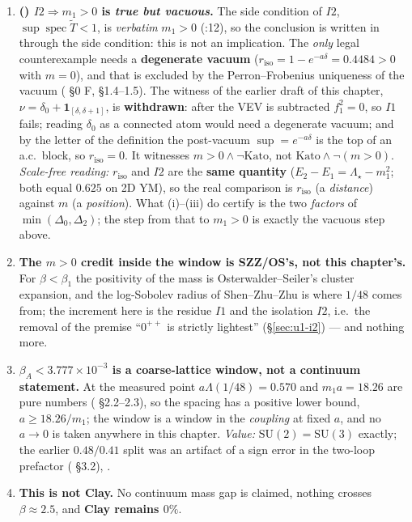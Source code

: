 \begin{enumerate}[label=\textbf{D.\arabic*.},leftmargin=3.4em]
\item \textbf{() $I2\Rightarrow m_1>0$ is \emph{true but vacuous}.} The side
      condition of $I2$, $\sup\operatorname{spec}\widetilde T<1$, is \emph{verbatim} $m_1>0$
      (:12), so the conclusion is written in through the side condition: this is not
      an implication. The \emph{only} legal counterexample needs a \textbf{degenerate vacuum}
      ($r_{\mathrm{iso}}=1-e^{-a\delta}=0.4484>0$ with $m=0$), and that is excluded by the
      Perron--Frobenius uniqueness of the vacuum ( \S0 F, \S1.4--1.5). The
      witness of the earlier draft of this chapter, $\nu=\delta_0+\mathbf 1_{[\delta,\delta+1]}$,
      is \textbf{withdrawn}: after the VEV is subtracted $f_1^2=0$, so $I1$ fails; reading
      $\delta_0$ as a connected atom would need a degenerate vacuum; and by the letter of the
      definition the post-vacuum $\sup=e^{-a\delta}$ is the top of an a.c.\ block, so
      $r_{\mathrm{iso}}=0$. It witnesses $m>0\wedge\neg\mathrm{Kato}$, not
      $\mathrm{Kato}\wedge\neg(m>0)$.
      \emph{Scale-free reading:} $r_{\mathrm{iso}}$ and $I2$ are the \textbf{same quantity}
      ($E_2-E_1=\Lambda_\star-m_1^2$; both equal $0.625$ on 2D YM), so the real comparison is
      $r_{\mathrm{iso}}$ (a \emph{distance}) against $m$ (a \emph{position}). What (i)--(iii) do
      certify is the two \emph{factors} of $\min(\Delta_0,\Delta_2)$; the step from that to
      $m_1>0$ is exactly the vacuous step above.
\item \textbf{The $m>0$ credit inside the window is SZZ/OS's, not this chapter's.} For
      $\beta<\beta_1$ the positivity of the mass is Osterwalder--Seiler's cluster expansion, and
      the log-Sobolev radius of Shen--Zhu--Zhu is where $1/48$ comes from; the increment here is
      the residue $I1$ and the isolation $I2$, i.e.\ the removal of the premise ``$0^{++}$ is
      strictly lightest'' (\S\ref{sec:u1-i2}) --- and nothing more.
\item \textbf{$\beta_A<3.777\times10^{-3}$ is a coarse-lattice window, not a continuum statement.} At the
      measured point $a\Lambda(1/48)=0.570$ and $m_1a=18.26$ are pure
      numbers ( \S2.2--2.3), so the spacing has a positive lower bound,
      $a\ge18.26/m_1$; the window is a window in the \emph{coupling} at fixed $a$, and no $a\to0$
      is taken anywhere in this chapter. \emph{Value:} $\mathrm{SU}(2)=\mathrm{SU}(3)$ exactly; the
      earlier $0.48/0.41$ split was an artifact of a sign error in the two-loop prefactor
      ( \S3.2), \LT{}.
\item \textbf{This is not Clay.} No continuum mass gap is claimed, nothing crosses
      $\beta\approx2.5$, and \textbf{Clay remains $0\%$}.
\end{enumerate}

